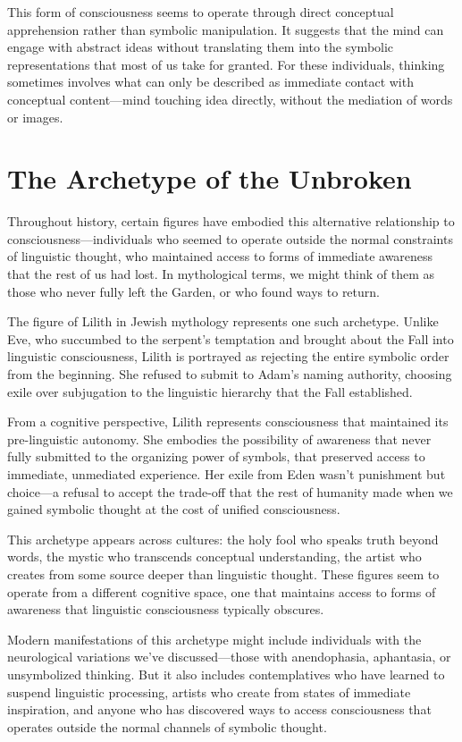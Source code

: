 This form of consciousness seems to operate through direct conceptual apprehension rather than symbolic manipulation. It suggests that the mind can engage with abstract ideas without translating them into the symbolic representations that most of us take for granted. For these individuals, thinking sometimes involves what can only be described as immediate contact with conceptual content—mind touching idea directly, without the mediation of words or images.

\section{The Archetype of the Unbroken}

Throughout history, certain figures have embodied this alternative relationship to consciousness—individuals who seemed to operate outside the normal constraints of linguistic thought, who maintained access to forms of immediate awareness that the rest of us had lost. In mythological terms, we might think of them as those who never fully left the Garden, or who found ways to return.

The figure of Lilith in Jewish mythology represents one such archetype. Unlike Eve, who succumbed to the serpent's temptation and brought about the Fall into linguistic consciousness, Lilith is portrayed as rejecting the entire symbolic order from the beginning. She refused to submit to Adam's naming authority, choosing exile over subjugation to the linguistic hierarchy that the Fall established.

From a cognitive perspective, Lilith represents consciousness that maintained its pre-linguistic autonomy. She embodies the possibility of awareness that never fully submitted to the organizing power of symbols, that preserved access to immediate, unmediated experience. Her exile from Eden wasn't punishment but choice—a refusal to accept the trade-off that the rest of humanity made when we gained symbolic thought at the cost of unified consciousness.

This archetype appears across cultures: the holy fool who speaks truth beyond words, the mystic who transcends conceptual understanding, the artist who creates from some source deeper than linguistic thought. These figures seem to operate from a different cognitive space, one that maintains access to forms of awareness that linguistic consciousness typically obscures.

Modern manifestations of this archetype might include individuals with the neurological variations we've discussed—those with anendophasia, aphantasia, or unsymbolized thinking. But it also includes contemplatives who have learned to suspend linguistic processing, artists who create from states of immediate inspiration, and anyone who has discovered ways to access consciousness that operates outside the normal channels of symbolic thought.

